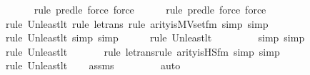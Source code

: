 \begin{isabellebody}
\ \ \ \ \ \isamarkupfalse%
{\isacharparenleft}{\kern0pt}rule\ pred{\isacharunderscore}{\kern0pt}le{\isacharcomma}{\kern0pt}\ force{\isacharcomma}{\kern0pt}\ force{\isacharparenright}{\kern0pt}\isanewline
\ \ \ \ \ \isamarkupfalse%
{\isacharparenleft}{\kern0pt}rule\ pred{\isacharunderscore}{\kern0pt}le{\isacharcomma}{\kern0pt}\ force{\isacharcomma}{\kern0pt}\ force{\isacharparenright}{\kern0pt}{\isacharplus}{\kern0pt}\isanewline
\ \ \ \ \ \isamarkupfalse%
{\isacharparenleft}{\kern0pt}rule\ Un{\isacharunderscore}{\kern0pt}least{\isacharunderscore}{\kern0pt}lt{\isacharcomma}{\kern0pt}\ rule\ le{\isacharunderscore}{\kern0pt}trans{\isacharcomma}{\kern0pt}\ rule\ arity{\isacharunderscore}{\kern0pt}is{\isacharunderscore}{\kern0pt}MVset{\isacharunderscore}{\kern0pt}fm{\isacharcomma}{\kern0pt}\ simp{\isacharcomma}{\kern0pt}\ simp{\isacharparenright}{\kern0pt}\isanewline
\ \ \ \ \ \ \isamarkupfalse%
{\isacharparenleft}{\kern0pt}rule\ Un{\isacharunderscore}{\kern0pt}least{\isacharunderscore}{\kern0pt}lt{\isacharcomma}{\kern0pt}\ simp{\isacharcomma}{\kern0pt}\ simp{\isacharparenright}{\kern0pt}{\isacharplus}{\kern0pt}\isanewline
\ \ \ \ \ \isamarkupfalse%
{\isacharparenleft}{\kern0pt}rule\ Un{\isacharunderscore}{\kern0pt}least{\isacharunderscore}{\kern0pt}lt{\isacharparenright}{\kern0pt}{\isacharplus}{\kern0pt}\isanewline
\ \ \ \ \ \ \ \isamarkupfalse%
\ {\isacharparenleft}{\kern0pt}simp{\isacharcomma}{\kern0pt}\ simp{\isacharparenright}{\kern0pt}\isanewline
\ \ \ \ \ \isamarkupfalse%
{\isacharparenleft}{\kern0pt}rule\ Un{\isacharunderscore}{\kern0pt}least{\isacharunderscore}{\kern0pt}lt{\isacharparenright}{\kern0pt}{\isacharplus}{\kern0pt}\isanewline
\ \ \ \ \ \ \isamarkupfalse%
{\isacharparenleft}{\kern0pt}rule\ le{\isacharunderscore}{\kern0pt}trans{\isacharcomma}{\kern0pt}rule\ arity{\isacharunderscore}{\kern0pt}is{\isacharunderscore}{\kern0pt}HS{\isacharunderscore}{\kern0pt}fm{\isacharcomma}{\kern0pt}\ simp{\isacharcomma}{\kern0pt}\ simp{\isacharparenright}{\kern0pt}\isanewline
\ \ \ \ \ \ \isamarkupfalse%
{\isacharparenleft}{\kern0pt}rule\ Un{\isacharunderscore}{\kern0pt}least{\isacharunderscore}{\kern0pt}lt{\isacharparenright}{\kern0pt}{\isacharplus}{\kern0pt}\isanewline
\ \ \isamarkupfalse%
\ assms\isanewline
\ \ \ \ \ \ \ \isamarkupfalse%
\ auto{\isacharbrackleft}{\kern0pt}{}{\isacharbrackright}{\kern0pt}\isanewline
\ \ \isamarkupfalse%

\end{isabellebody}
